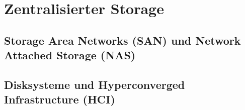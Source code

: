 \documentclass[a4paper]{article}
\title{\docTitle}
\author{Moritz}
\date{\today}
\begin{document}
\maketitle
\tableofcontents


\section{Zentralisierter Storage}

\subsection{Storage Area Networks (SAN) und Network Attached Storage (NAS)}

\subsection{Disksysteme und Hyperconverged Infrastructure (HCI)}
\end{document}

